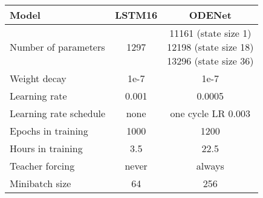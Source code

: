 \begin{tabular}{@{}l c c @{}}
\toprule
\textbf{Model} & \textbf{LSTM16} & \textbf{ODENet} \\ \midrule %
Number of   parameters & 1297 & \makecell{11161 (state size 1)\\12198 (state size 18)\\13296 (state size 36)} \\
Weight decay & 1e-7 & 1e-7             \\
Learning rate & 0.001 & 0.0005            \\
Learning rate schedule & none & one cycle LR 0.003      \\
Epochs in training & 1000 & 1200            \\
Hours in training & 3.5 & 22.5           \\
Teacher forcing & never & always       \\ 
Minibatch size & 64 &   256  \\ \bottomrule
\end{tabular}%
